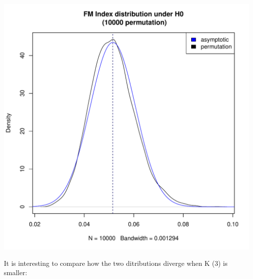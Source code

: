 \documentclass[shortnames,nojss,article]{jss}\usepackage[]{graphicx}\usepackage[]{color}
\makeatletter
\def\maxwidth{ %
  \ifdim\Gin@nat@width>\linewidth
    \linewidth
  \else
    \Gin@nat@width
  \fi
}
\newenvironment{knitrout}{}{} %
\makeatother
\begin{document}
\begin{knitrout}
{\centering \includegraphics[width=\maxwidth]{figure/FM_permutation_example_1} 

}



\end{knitrout}


It is interesting to compare how the two ditributions diverge when K (3) is smaller:
\end{document}
